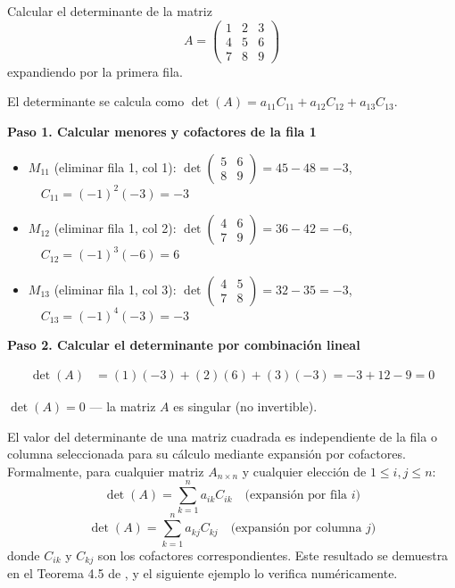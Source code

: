 \begin{example}
\label{ex:det-expansion}
Calcular el determinante de la matriz 
\[
A = \begin{pmatrix}
1 & 2 & 3 \\
4 & 5 & 6 \\
7 & 8 & 9
\end{pmatrix}
\]
expandiendo por la primera fila.
\begin{myproof}
El determinante se calcula como $\det(A) = a_{11}C_{11} + a_{12}C_{12} + a_{13}C_{13}$.

\textbf{Paso 1. Calcular menores y cofactores de la fila 1}

\begin{itemize}
\item $M_{11}$ (eliminar fila 1, col 1): $\det\begin{pmatrix} 5 & 6 \\ 8 & 9 \end{pmatrix} = 45-48=-3$, $\quad C_{11}=(-1)^{2}(-3)=-3$

\item $M_{12}$ (eliminar fila 1, col 2): $\det\begin{pmatrix} 4 & 6 \\ 7 & 9 \end{pmatrix} = 36-42=-6$, $\quad C_{12}=(-1)^{3}(-6)=6$

\item $M_{13}$ (eliminar fila 1, col 3): $\det\begin{pmatrix} 4 & 5 \\ 7 & 8 \end{pmatrix} = 32-35=-3$, $\quad C_{13}=(-1)^{4}(-3)=-3$
\end{itemize}

\textbf{Paso 2. Calcular el determinante por combinación lineal}

\begin{align*}
\det(A) &= (1)(-3) + (2)(6) + (3)(-3) = -3 + 12 - 9 = 0
\end{align*}

$\boxed{\det(A) = 0}$ — la matriz $A$ es singular (no invertible).
\end{myproof}
\end{example}

\begin{theorem}
\label{rem:invariance-det}
El valor del determinante de una matriz cuadrada es independiente de la fila o columna seleccionada para su cálculo mediante expansión por cofactores. Formalmente, para cualquier matriz $A_{n\times n}$ y cualquier elección de $1 \leq i,j \leq n$:
\[
\det(A) = \sum_{k=1}^{n} a_{ik}C_{ik} \quad \text{(expansión por fila } i\text{)}
\]
\[
\det(A) = \sum_{k=1}^{n} a_{kj}C_{kj} \quad \text{(expansión por columna } j\text{)}
\]
donde $C_{ik}$ y $C_{kj}$ son los cofactores correspondientes. Este resultado se demuestra en el Teorema 4.5 de \cite{araujo2014algebra}, y el siguiente ejemplo lo verifica numéricamente.
\end{theorem}

